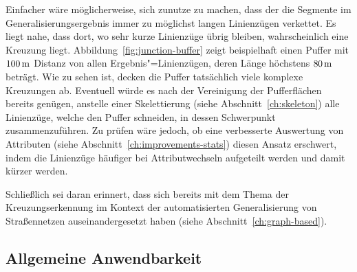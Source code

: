 \documentclass[../main/thesis.tex]{subfiles}
\begin{document}

Einfacher wäre möglicherweise, sich zunutze zu machen, dass der  die Segmente im Generalisierungsergebnis immer zu möglichst langen Linienzügen verkettet.
Es liegt nahe, dass dort, wo sehr kurze Linienzüge übrig bleiben, wahrscheinlich eine Kreuzung liegt.
Abbildung~\ref{fig:junction-buffer} zeigt beispielhaft einen Puffer mit $\unit[100]{m}$ Distanz von allen Ergebnis"=Linienzügen, deren Länge höchstens $\unit[80]{m}$ beträgt.
Wie zu sehen ist, decken die Puffer tatsächlich viele komplexe Kreuzungen ab.
Eventuell würde es nach der Vereinigung der Pufferflächen bereits genügen, anstelle einer Skelettierung (siehe Abschnitt~\ref{ch:skeleton}) alle Linienzüge, welche den Puffer schneiden, in dessen Schwerpunkt zusammenzuführen.
Zu prüfen wäre jedoch, ob eine verbesserte Auswertung von Attributen (siehe Abschnitt~\ref{ch:improvements-stats}) diesen Ansatz erschwert, indem die Linienzüge häufiger bei Attributwechseln aufgeteilt werden und damit kürzer werden.

Schließlich sei daran erinnert, dass sich \citeauthor{MM99} bereits mit dem Thema der Kreuzungserkennung im Kontext der automatisierten Generalisierung von Straßennetzen auseinandergesetzt haben (siehe Abschnitt~\ref{ch:graph-based}). 



\subsection{Allgemeine Anwendbarkeit}
\end{document}
